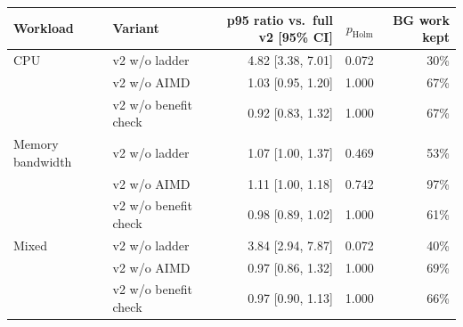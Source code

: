 \begin{tabular}{llrrr}
\toprule
Workload & Variant & p95 ratio vs.\ full v2 [95\% CI] & $p_{\mathrm{Holm}}$ & BG work kept \\
\midrule
CPU & v2 w/o ladder & 4.82 [3.38, 7.01] & 0.072 & 30\% \\
 & v2 w/o AIMD & 1.03 [0.95, 1.20] & 1.000 & 67\% \\
 & v2 w/o benefit check & 0.92 [0.83, 1.32] & 1.000 & 67\% \\
Memory bandwidth & v2 w/o ladder & 1.07 [1.00, 1.37] & 0.469 & 53\% \\
 & v2 w/o AIMD & 1.11 [1.00, 1.18] & 0.742 & 97\% \\
 & v2 w/o benefit check & 0.98 [0.89, 1.02] & 1.000 & 61\% \\
Mixed & v2 w/o ladder & 3.84 [2.94, 7.87] & 0.072 & 40\% \\
 & v2 w/o AIMD & 0.97 [0.86, 1.32] & 1.000 & 69\% \\
 & v2 w/o benefit check & 0.97 [0.90, 1.13] & 1.000 & 66\% \\
\bottomrule
\end{tabular}